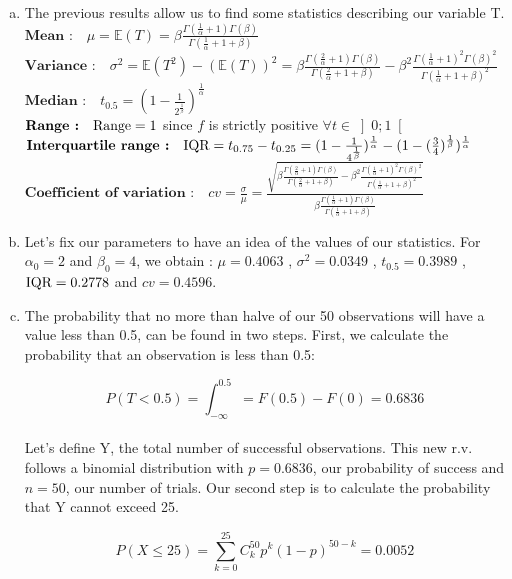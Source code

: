 \documentclass[a4paper]{article}
\begin{document}
\begin{enumerate}[(a)]
\item The previous results allow us to find some statistics describing our variable T.
\\
$\textbf{Mean :} \quad \mu = \mathbb{E}(T) = \beta \frac{\Gamma(\frac{1}{\alpha}+1)\Gamma(\beta)}{\Gamma(\frac{1}{\alpha}+1+\beta)} $
\\
$\textbf{Variance :} \quad \sigma^2 = \mathbb{E}(T^2)-(\mathbb{E}(T))^2 = \beta\frac{\Gamma(\frac{2}{\alpha}+1)\Gamma(\beta)}{\Gamma(\frac{2}{\alpha}+1+\beta)} - \beta^2 \frac{\Gamma(\frac{1}{\alpha}+1)^2\Gamma(\beta)^2}{\Gamma(\frac{1}{\alpha}+1+\beta)^2}$
\\
$\textbf{Median :} \quad t_{0.5} = (1-\frac{1}{2^{\frac{1}{\beta}}})^\frac{1}{\alpha}$
\\
$\textbf{Range :} \quad \textup{Range} = 1$ since $f$ is strictly positive $\forall t \in \left ]  0;1 \right [ $
\\
$\textbf{Interquartile range :} \quad \textup{IQR} = t_{0.75} - t_{0.25} = (1-\frac{1}{4^\frac{1}{\beta}})^\frac{1}{\alpha} - (1-(\frac{3}{4})^\frac{1}{\beta})^\frac{1}{\alpha}$
\\
$\textbf{Coefficient of variation :} \quad cv = \frac{\sigma}{\mu} = \frac{\sqrt{\beta\frac{\Gamma(\frac{2}{\alpha}+1)\Gamma(\beta)}{\Gamma(\frac{2}{\alpha}+1+\beta)} - \beta^2 \frac{\Gamma(\frac{1}{\alpha}+1)^2\Gamma(\beta)^2}{\Gamma(\frac{1}{\alpha}+1+\beta)^2}}}{\beta \frac{\Gamma(\frac{1}{\alpha}+1)\Gamma(\beta)}{\Gamma(\frac{1}{\alpha}+1+\beta)}}$

\item Let's fix our parameters to have an idea of the values of our statistics. For $\alpha_0 = 2$ and $\beta_0 = 4$, we obtain : $\mu = 0.4063$ , $\sigma^2 = 0.0349$ , $t_{0.5} = 0.3989$ , $\textup{IQR} = 0.2778$ and $cv = 0.4596$.

\item The probability that no more than halve of our 50 observations will have a value less than 0.5, can be found in two steps. First, we calculate the probability that an observation is less than 0.5:

$$P(T<0.5) = \int_{-\infty}^{0.5} = F(0.5) - F(0) = 0.6836 $$
\\
Let's define Y, the total number of successful observations. This new r.v. follows a binomial distribution with $p=0.6836$, our probability of success and $n=50$, our number of trials. Our second step is to calculate the probability that Y cannot exceed 25.

$$P(X \leq 25) = \sum_{k=0}^{25} C_{k}^{50}p^{k}(1-p)^{50-k} = 0.0052$$


\end{enumerate}
\end{document}
